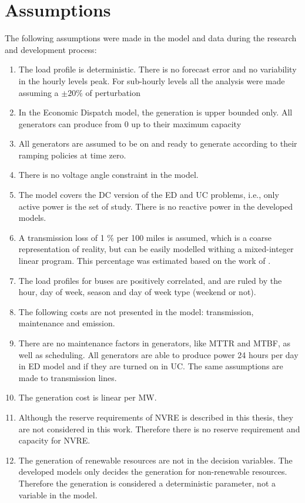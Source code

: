 \documentclass[12pt,LUDisStyle,twosided]{book}
\begin{document}
\section{Assumptions}

The following assumptions were made in the model and data during the research and development process:

\begin{enumerate}
\item The load profile is deterministic. There is no forecast error and no variability in the hourly levels peak. For sub-hourly levels all the analysis were made assuming a $\pm20\%$ of perturbation
\item In the Economic Dispatch model, the generation is upper bounded only. All generators can produce from 0 up to their maximum capacity
\item All generators are assumed to be on and ready to generate according to their ramping policies at time zero.
\item There is no voltage angle constraint in the model.
\item The model covers the DC version of the ED and UC problems, i.e., only active power is the set of study. There is no reactive power in the developed models.
\item A transmission loss of 1 \% per 100 miles is assumed, which is a coarse representation of reality, but can be easily modelled withing a mixed-integer linear program. This percentage was estimated based on the work of \citeauthor{short} \cite{short}.
\item The load profiles for buses are positively correlated, and are ruled by the hour, day of week, season and day of week type (weekend or not).
\item The following costs are not presented in the model: transmission, maintenance and emission.
\item There are no maintenance factors in generators, like MTTR and MTBF, as well as scheduling. All generators are able to produce power 24 hours per day in ED model and if they are turned on in UC. The same assumptions are made to transmission lines.
\item The generation cost is linear per MW.
\item Although the reserve requirements of NVRE is described in this thesis, they are not considered in this work. Therefore there is no reserve requirement and capacity for NVRE.
\item The generation of renewable resources are not in the decision variables. The developed models only decides the generation for non-renewable resources. Therefore the generation is considered a deterministic parameter, not a variable in the model.

\end{enumerate}
\end{document}
